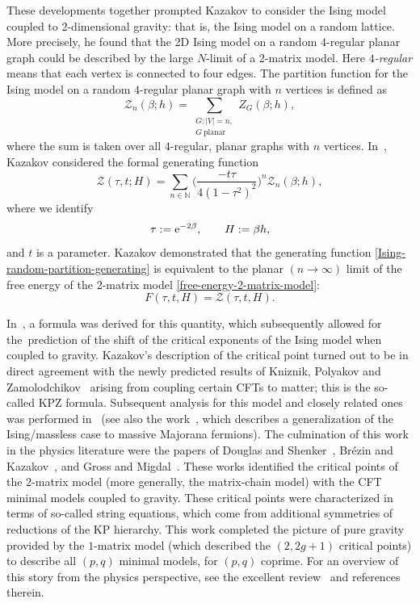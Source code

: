 \documentclass[pdftex]{sigma}
\numberwithin{equation}{section}
\begin{document}
These developments together prompted Kazakov to consider the Ising model coupled to 2-dimensional gravity: that is, the Ising model on a random lattice. More precisely, he found that the 2D Ising model on a random $4$-regular planar graph could be described by the large $N$-limit of a
2-matrix model. Here \textit{$4$-regular} means that each vertex is connected to four edges. The partition function for the Ising model on a random $4$-regular planar graph with $n$ vertices is defined as
 \begin{equation}\label{Ising-random-partition-n} %
 \mathcal{Z}_n(\beta;h) = \sum_{\substack{G:|V| = n,\\ G \ {\textrm{planar}}}} Z_G(\beta;h),
 \end{equation}
where the sum is taken over all $4$-regular, planar graphs with $n$ vertices. In~\cite{Kazakov1}, Kazakov considered the formal generating function
 \begin{equation}\label{Ising-random-partition-generating}
 \mathcal{Z}(\tau,t;H) = \sum_{n \in \mathbb{N}} \biggl(\frac{-t\tau}{4(1-\tau^2)^2}\biggr)^n \mathcal{Z}_n(\beta;h),
 \end{equation}
where we identify
 \begin{equation*}
 \tau := {\rm e}^{-2\beta},\qquad H := \beta h,
 \end{equation*}
and $t$ is a parameter. Kazakov demonstrated that the generating function \eqref{Ising-random-partition-generating} is equivalent to the planar $(n \to \infty)$ limit of the free energy of the 2-matrix model \eqref{free-energy-2-matrix-model}:
\begin{equation*}
 F(\tau,t,H) = \mathcal{Z}(\tau,t,H).
\end{equation*}

In~\cite{Kazakov2, Kazakov1}, a formula was derived for this quantity, which subsequently allowed for the~prediction of the shift of the critical exponents of the Ising model when coupled
to gravity. Kazakov's description of the critical point turned out to be in direct agreement with the newly predicted results of Kniznik, Polyakov and Zamolodchikov~\cite{KPZ} arising from coupling certain CFTs to matter; this is the so-called KPZ formula.
Subsequent analysis for this model and closely related ones was performed in~\cite{Kazakov2,Kazakov3} (see also the work~\cite{Zamolodchikov-Ishimoto}, which describes a generalization of the Ising/massless case to massive Majorana fermions). The culmination of this work in the physics literature were the papers of
Douglas and Shenker~\cite{DS}, Br\'{e}zin and Kazakov~\cite{KB}, and Gross and Migdal~\cite{GM1,GM2}. These works identified the critical points of the $2$-matrix model (more generally, the matrix-chain model) with the CFT minimal models coupled to gravity. These critical points were characterized in terms of so-called string equations, which come from additional symmetries of reductions of the KP hierarchy. This work completed the picture of pure gravity provided by the $1$-matrix model (which described the $(2,2g+1)$ critical points) to describe all $(p,q)$ minimal models, for $(p,q)$ coprime. For an overview of this story from the physics perspective, see
the excellent review~\cite{PGZ} and references therein.
\end{document}
